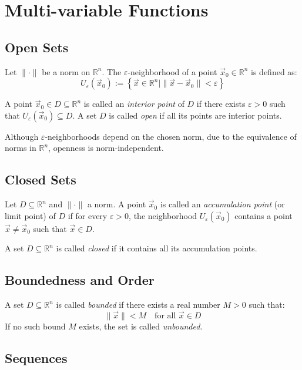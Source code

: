 \newpage
\section{Multi-variable Functions}

\subsection{Open Sets}

Let \( \| \cdot \| \) be a norm on \( \mathbb{R}^n \). The \( \varepsilon \)-neighborhood of a point \( \vec{x}_0 \in \mathbb{R}^n \) is defined as:
\[
U_\varepsilon(\vec{x}_0) := \left\{ \vec{x} \in \mathbb{R}^n \mid \| \vec{x} - \vec{x}_0 \| < \varepsilon \right\}
\]

A point \( \vec{x}_0 \in D \subseteq \mathbb{R}^n \) is called an \emph{interior point} of \( D \) if there exists \( \varepsilon > 0 \) such that \( U_\varepsilon(\vec{x}_0) \subseteq D \).  
A set \( D \) is called \emph{open} if all its points are interior points.
\vspace{\baselineskip}

Although \( \varepsilon \)-neighborhoods depend on the chosen norm, due to the equivalence of norms in \( \mathbb{R}^n \), openness is norm-independent.


\subsection{Closed Sets}

Let \( D \subseteq \mathbb{R}^n \) and \( \| \cdot \| \) a norm. A point \( \vec{x}_0 \) is called an \emph{accumulation point} (or limit point) of \( D \) if for every \( \varepsilon > 0 \), the neighborhood \( U_\varepsilon(\vec{x}_0) \) contains a point \( \vec{x} \ne \vec{x}_0 \) such that \( \vec{x} \in D \).

A set \( D \subseteq \mathbb{R}^n \) is called \emph{closed} if it contains all its accumulation points.

\subsection{Boundedness and Order}

A set \( D \subseteq \mathbb{R}^n \) is called \emph{bounded} if there exists a real number \( M > 0 \) such that:
\[
\|\vec{x}\| < M \quad \text{for all } \vec{x} \in D
\]
If no such bound \( M \) exists, the set is called \emph{unbounded}.


\subsection{Sequences}

